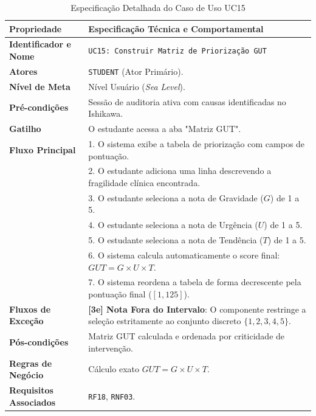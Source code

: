\begin{table}[!ht]
\centering
\caption{Especificação Detalhada do Caso de Uso UC15}
\label{tab_uc15}
\footnotesize
\begin{tabularx}{\textwidth}{p{3.5cm} X}
\toprule
\textbf{Propriedade} & \textbf{Especificação Técnica e Comportamental} \\
\midrule
\textbf{Identificador e Nome} & \texttt{UC15: Construir Matriz de Priorização GUT} \\
\textbf{Atores} & \texttt{STUDENT} (Ator Primário). \\
\textbf{Nível de Meta} & Nível Usuário (\textit{Sea Level}). \\
\textbf{Pré-condições} & Sessão de auditoria ativa com causas identificadas no Ishikawa. \\
\textbf{Gatilho} & O estudante acessa a aba "Matriz GUT". \\
\textbf{Fluxo Principal} & 
1. O sistema exibe a tabela de priorização com campos de pontuação.\\
& 2. O estudante adiciona uma linha descrevendo a fragilidade clínica encontrada.\\
& 3. O estudante seleciona a nota de Gravidade ($G$) de 1 a 5.\\
& 4. O estudante seleciona a nota de Urgência ($U$) de 1 a 5.\\
& 5. O estudante seleciona a nota de Tendência ($T$) de 1 a 5.\\
& 6. O sistema calcula automaticamente o score final: $GUT = G \times U \times T$.\\
& 7. O sistema reordena a tabela de forma decrescente pela pontuação final ($[1, 125]$). \\
\textbf{Fluxos de Exceção} & 
\textbf{[3e] Nota Fora do Intervalo}: O componente restringe a seleção estritamente ao conjunto discreto $\{1, 2, 3, 4, 5\}$. \\
\textbf{Pós-condições} & Matriz GUT calculada e ordenada por criticidade de intervenção. \\
\textbf{Regras de Negócio} & Cálculo exato $GUT = G \times U \times T$. \\
\textbf{Requisitos Associados} & \texttt{RF18}, \texttt{RNF03}. \\
\bottomrule
\end{tabularx}
\end{table}

